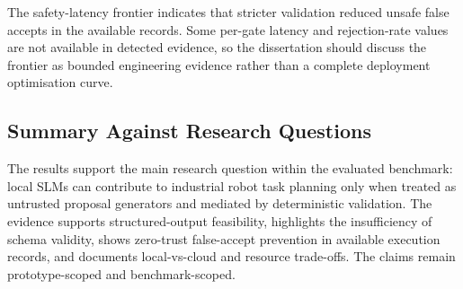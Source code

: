 The safety-latency frontier indicates that stricter validation reduced unsafe false accepts in the available records. Some per-gate latency and rejection-rate values are not available in detected evidence, so the dissertation should discuss the frontier as bounded engineering evidence rather than a complete deployment optimisation curve.

\subsection{Summary Against Research Questions}

The results support the main research question within the evaluated benchmark: local SLMs can contribute to industrial robot task planning only when treated as untrusted proposal generators and mediated by deterministic validation. The evidence supports structured-output feasibility, highlights the insufficiency of schema validity, shows zero-trust false-accept prevention in available execution records, and documents local-vs-cloud and resource trade-offs. The claims remain prototype-scoped and benchmark-scoped.
